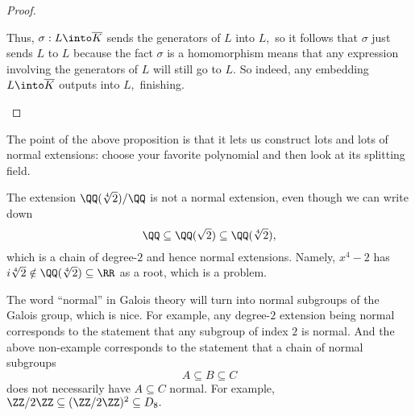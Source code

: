 \begin{proof}
\begin{itemize}
		Thus, $\sigma:L\into\overline K$ sends the generators of $L$ into $L,$ so it follows that $\sigma$ just sends $L$ to $L$ because the fact $\sigma$ is a homomorphism means that any expression involving the generators of $L$ will still go to $L.$ So indeed, any embedding $L\into\overline K$ outputs into $L,$ finishing.
		\qedhere
	\end{itemize}
\end{proof}
The point of the above proposition is that it lets us construct lots and lots of normal extensions: choose your favorite polynomial and then look at its splitting field.
\begin{nex}
	The extension $\QQ(\sqrt[4]2)/\QQ$ is not a normal extension, even though we can write down
	\[\QQ\subseteq\QQ(\sqrt2)\subseteq\QQ(\sqrt[4]2),\]
	which is a chain of degree-$2$ and hence normal extensions. Namely, $x^4-2$ has $i\sqrt[4]2\notin\QQ(\sqrt[4]2)\subseteq\RR$ as a root, which is a problem.
\end{nex}
\begin{remark}
	The word ``normal'' in Galois theory will turn into normal subgroups of the Galois group, which is nice. For example, any degree-$2$ extension being normal corresponds to the statement that any subgroup of index $2$ is normal. And the above non-example corresponds to the statement that a chain of normal subgroups
	\[A\subseteq B\subseteq C\]
	does not necessarily have $A\subseteq C$ normal. For example, $\ZZ/2\ZZ\subseteq(\ZZ/2\ZZ)^2\subseteq D_8.$
\end{remark}

